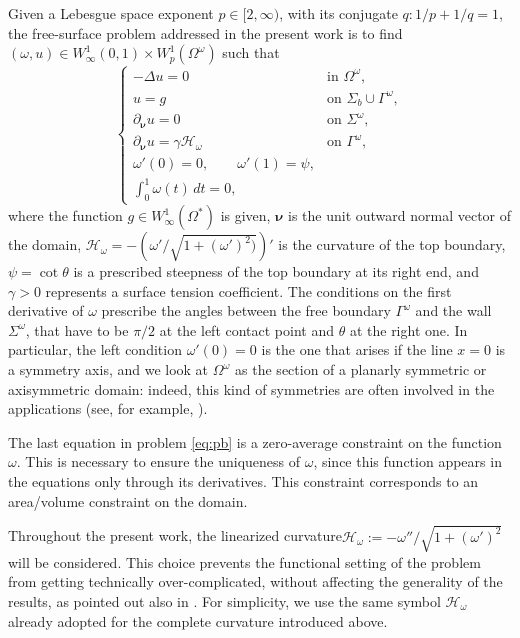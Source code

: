 \documentclass[final,hidelinks]{siamart1116Arxiv}
\numberwithin{theorem}{section}
\newcommand{\sol}{{u}}
\newcommand{\normal}{{\boldsymbol \nu}}
\newcommand{\allhold}{{\Omega^*}}
\newcommand{\angolo}{{\psi}}
\newcommand{\curv}{{\mathcal{H}_\omega}}
\begin{document}
Given a Lebesgue space exponent $p\in[2,\infty)$, with its conjugate $q\colon 1/p+1/q=1$, the free-surface problem addressed in the present work is to find $(\omega, \sol)\in W^1_\infty(0,1)\times W^1_p(\Omega^\omega)$ such that
\begin{equation}\label{eq:pb}
    \begin{cases}
	-\Delta \sol = 0 & \text{in } \Omega^\omega, \\
	\sol = g & \text{on } \Sigma_b \cup \Gamma^\omega, \\
	\partial_\normal \sol = 0 & \text{on } \Sigma^\omega, \\
	\partial_\normal \sol = \gamma\curv & \text{on } \Gamma^\omega, \\
	\omega'(0)=0,\qquad \omega'(1) = \angolo, \\
	\int_0^1 \omega(t)\,dt=0,
    \end{cases}
\end{equation}
where the function $g\in W^1_\infty(\allhold)$ is given, $\normal$ is the unit outward normal vector of the domain, $\curv=-\left(\omega'/\sqrt{1+(\omega')^2)}\right)'$ is the curvature of the top boundary, $\angolo=\cot\theta$ is a prescribed steepness of the top boundary at its right end, and $\gamma>0$ represents a surface tension coefficient.
The conditions on the first derivative of $\omega$ prescribe the angles between the free boundary $\Gamma^\omega$ and the wall $\Sigma^\omega$, that have to be $\pi/2$ at the left contact point and $\theta$ at the right one.
In particular, the left condition $\omega'(0)=0$ is the one that arises if the line $x=0$ is a symmetry axis, and we look at $\Omega^\omega$ as the section of a planarly symmetric or axisymmetric domain: indeed, this kind of symmetries are often involved in the applications (see, for example, \cite{axisymm,MovingCL,Yamamoto}).
\begin{rmrk}
    The last equation in problem \cref{eq:pb} is a zero-average constraint on the function $\omega$.
    This is necessary to ensure the uniqueness of $\omega$, since this function appears in the equations only through its derivatives.
    This constraint corresponds to an area/volume constraint on the domain.
\end{rmrk}
\begin{rmrk}
    Throughout the present work, the linearized curvature\linebreak[4] $\curv:=-\omega''/\sqrt{1+(\omega')^2}$ will be considered.
    This choice prevents the functional setting of the problem from getting technically over-complicated, without affecting the generality of the results, as pointed out also in \cite{ANS14, SS91}.
    For simplicity, we use the same symbol $\curv$ already adopted for the complete curvature introduced above.
\end{rmrk}
\end{document}

